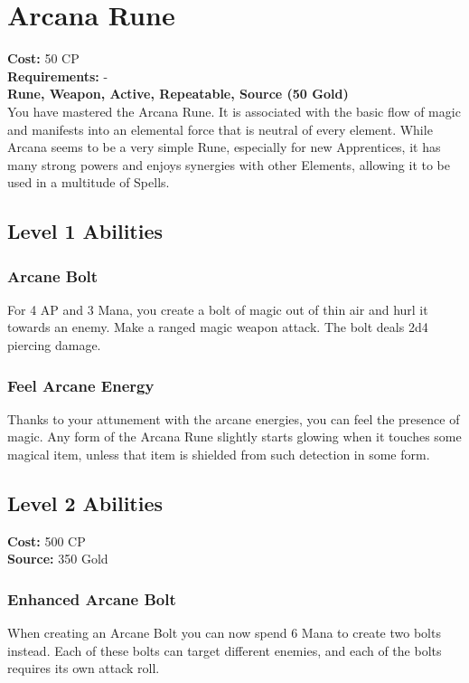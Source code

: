 \twocolumn
\section{Arcana Rune}\label{rune:arcana}
\textbf{Cost:} 50 CP\\
\textbf{Requirements:} -\\
\textbf{Rune, Weapon, Active, Repeatable, Source (50 Gold)}\\
You have mastered the Arcana Rune. It is associated with the basic flow of magic and manifests into an elemental force that is neutral of every element. While Arcana seems to be a very simple Rune, especially for new Apprentices, it has many strong powers and enjoys synergies with other Elements, allowing it to be used in a multitude of Spells.\\
\subsection{Level 1 Abilities}

\subsubsection{Arcane Bolt}
For 4 AP and 3 Mana, you create a bolt of magic out of thin air and hurl it towards an enemy.
Make a ranged magic weapon attack.
The bolt deals 2d4 piercing damage.

\subsubsection{Feel Arcane Energy}
Thanks to your attunement with the arcane energies, you can feel the presence of magic.
Any form of the Arcana Rune slightly starts glowing when it touches some magical item, unless that item is shielded from such detection in some form.

\subsection{Level 2 Abilities}
\textbf{Cost:} 500 CP\\
\textbf{Source:} 350 Gold
\subsubsection{Enhanced Arcane Bolt}
When creating an Arcane Bolt you can now spend 6 Mana to create two bolts instead.
Each of these bolts can target different enemies, and each of the bolts requires its own attack roll.

